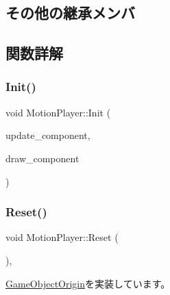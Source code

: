 \subsection*{その他の継承メンバ}


\subsection{関数詳解}
\mbox{\label{class_motion_player_ad49f85cbd150d7fffc35068c502e7e85}} 
\subsubsection{\texorpdfstring{Init()}{Init()}}
{\footnotesize\ttfamily void Motion\+Player\+::\+Init (\begin{DoxyParamCaption}\item[{\mbox{\hyperlink{class_update_component}{Update\+Component}} $\ast$}]{update\+\_\+component,  }\item[{\mbox{\hyperlink{class_draw_component}{Draw\+Component}} $\ast$}]{draw\+\_\+component }\end{DoxyParamCaption})}

\mbox{\label{class_motion_player_a326a495d5b68cea9caa99980cac919bd}} 
\subsubsection{\texorpdfstring{Reset()}{Reset()}}
{\footnotesize\ttfamily void Motion\+Player\+::\+Reset (\begin{DoxyParamCaption}{ }\end{DoxyParamCaption})\hspace{0.3cm}{\ttfamily [override]}, {\ttfamily [virtual]}}



\mbox{\hyperlink{class_game_object_origin_af9af378a4fd9028316a6fdb461ed6a10}{Game\+Object\+Origin}}を実装しています。

\mbox{\label{class_motion_player_aaef70673468175ad4a96c944cd90199c}} 
